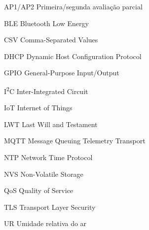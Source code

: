 \begin{siglas}
\item[AP1/AP2] Primeira/segunda avaliação parcial
\item[BLE] Bluetooth Low Energy
\item[CSV] Comma-Separated Values
\item[DHCP] Dynamic Host Configuration Protocol
\item[GPIO] General-Purpose Input/Output
\item[I\textsuperscript{2}C] Inter-Integrated Circuit
\item[IoT] Internet of Things
\item[LWT] Last Will and Testament
\item[MQTT] Message Queuing Telemetry Transport
\item[NTP] Network Time Protocol
\item[NVS] Non-Volatile Storage
\item[QoS] Quality of Service
\item[TLS] Transport Layer Security
\item[UR] Umidade relativa do ar
\end{siglas}
